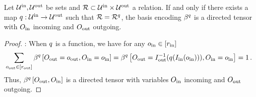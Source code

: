 \begin{theorem}
    \label{the:bencodingDirected}
    Let $\mathcal{U}^{\mathrm{in}},\mathcal{U}^{\mathrm{out}}$ be sets and $\mathcal{R}\subset\mathcal{U}^{\mathrm{in}}\times\mathcal{U}^{\mathrm{out}}$ a relation.
    If and only if there exists a map $q:\mathcal{U}^{\mathrm{in}}\rightarrow\mathcal{U}^{\mathrm{out}}$ such that $\mathcal{R}=\mathcal{R}^{q}$, the basis encoding $\beta^{q}$ is a directed tensor with $O_{\mathrm{in}}$ incoming and $O_{\mathrm{out}}$ outgoing.
\end{theorem}
\begin{proof}
    \proofrightsymbol:
    When $q$ is a function, we have for any $o_{\mathrm{in}}\in[r_{\mathrm{in}}]$
    \begin{align*}
        \sum_{o_{\mathrm{out}}\in[r_{\mathrm{out}}]} \beta^{q}\left[O_{\mathrm{out}}=o_{\mathrm{out}},O_{\mathrm{in}}=o_{\mathrm{in}}\right]
        =  \beta^{q}\left[O_{\mathrm{out}}=I_{\mathrm{out}}^{-1}(q(I_{\mathrm{in}}(o_{\mathrm{in}}))),O_{\mathrm{in}}=o_{\mathrm{in}}\right]
        = 1 \, .
    \end{align*}
    Thus, $\beta^{q}\left[O_{\mathrm{out}},O_{\mathrm{in}}\right]$ is a directed tensor with variables $O_{\mathrm{in}}$ incoming and $O_{\mathrm{out}}$ outgoing.


\end{proof}
